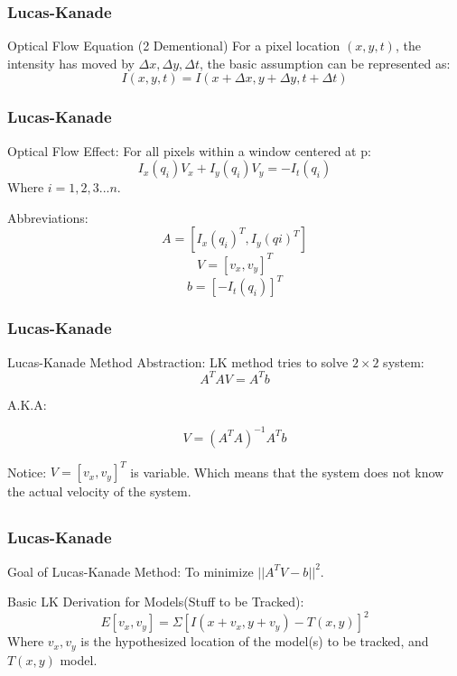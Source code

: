 \begin{frame}
\frametitle{Lucas-Kanade}
  \begin{blueblock}{Optical Flow Equation (2 Dementional)}
For a pixel location $(x, y, t)$, the intensity has moved by $\Delta
x, \Delta y, \Delta t$, the basic assumption can be represented as:
$$I(x, y, t) = I(x + \Delta x, y + \Delta y, t + \Delta t)$$

  \end{blueblock}
\end{frame}

\begin{frame}
\frametitle{Lucas-Kanade}
  \begin{blueblock}{Optical Flow Effect:}
For all pixels within a window centered at p:
$$I_x(q_i)V_x + I_y(q_i)V_y = -I_t(q_i) $$
Where  $i = 1,2,3 ... n$.

  \end{blueblock}

  \begin{greyblock}{Abbreviations:}
$$ A = [ I_x(q_i)^T, I_y(qi)^T] $$
$$ V = [v_x, v_y]^T $$
$$ b = [-I_t(q_i)]^T $$
  \end{greyblock}
\end{frame}

\begin{frame}
\frametitle{Lucas-Kanade}
  \begin{blueblock}{Lucas-Kanade Method Abstraction:}
LK method tries to solve $2 \times 2$ system:
$$A^TAV = A^Tb$$

A.K.A:

$$V = (A^TA)^{-1}A^Tb$$
  \end{blueblock}

  \begin{greyblock}{Notice:}
    $V = [v_x, v_y]^T$ is variable. Which means that the system does
    not know the actual velocity of the system.
  \end{greyblock}
\end{frame}

\subsection{}
\begin{frame}
\frametitle{Lucas-Kanade}
  \begin{blueblock}{Goal of Lucas-Kanade Method:}
To minimize $||A^TV - b||^2$.
  \end{blueblock}
Basic LK Derivation for Models(Stuff to be Tracked):
$$E[v_x, v_y] = \Sigma [I(x+v_x, y+v_y) - T(x, y)]^2$$
Where $v_x, v_y$ is the hypothesized location of the model(s) to be
tracked, and $T(x, y)$ model.
\end{frame}

